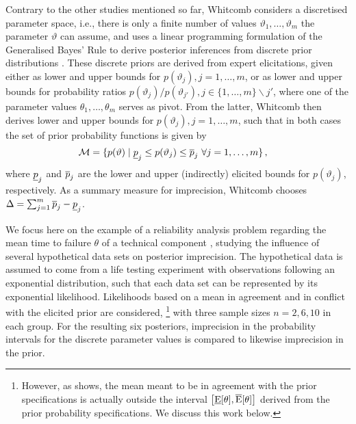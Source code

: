 Contrary to the other studies mentioned so far,
Whitcomb considers a discretised parameter space,
i.e., there is only a finite number of values $\vartheta_1, \ldots, \vartheta_m$ the parameter $\vartheta$ can assume,
and uses a linear programming formulation of the Generalised Bayes' Rule
to derive posterior inferences from discrete prior distributions \parencite[\S 3]{2005:whitcomb}. %
These discrete priors are derived from expert elicitations,
given either as lower and upper bounds for $p(\vartheta_j), j=1,\ldots,m$,
or as lower and upper bounds for probability ratios $p(\vartheta_j)/p(\vartheta_{j'}), j\in\{1,\ldots,m\} \backslash j'$,
where one of the parameter values $\theta_1, \ldots, \theta_m$ serves as pivot. %
From the latter, Whitcomb then derives lower and upper bounds for $p(\vartheta_j), j=1,\ldots,m$,
such that in both cases the set of prior probability functions is given by
\begin{align*}
\mathcal{M} &= \{ p(\vartheta) \mid \underline{p}_j \le p(\vartheta_j) \le \overline{p}_j\ \forall j=1,\ldots,m \}\,,
\end{align*}
where $\underline{p}_j$ and $\overline{p}_j$ are the lower and upper (indirectly) elicited bounds for $p(\vartheta_j)$, respectively.
As a summary measure for imprecision, Whitcomb chooses $\Delta = \sum_{j=1}^m \overline{p}_j-\underline{p}_j$.

We focus here on the example of a reliability analysis problem
regarding the mean time to failure $\theta$ of a technical component \parencite[\S 4.1]{2005:whitcomb}, %
studying the influence of several hypothetical data sets on posterior imprecision.
The hypothetical data is assumed to come from a life testing experiment
with observations following an exponential distribution,
such that each data set can be represented by its exponential likelihood.
Likelihoods based on a mean in agreement
and in conflict with the elicited prior are considered,%
\footnote{However, as \textcite[\S 4.3]{2011:krautenbacher} shows, the mean meant to be in agreement with
the prior specifications is actually outside the interval $\big[\underline{\operatorname{E}}[\theta], \overline{\operatorname{E}}[\theta]\big]$
derived from the prior probability specifications. We discuss this work below.}
with three sample sizes $n=2,6,10$ in each group.
For the resulting six posteriors, imprecision in the probability intervals for the discrete parameter values
is compared to likewise imprecision in the prior.

